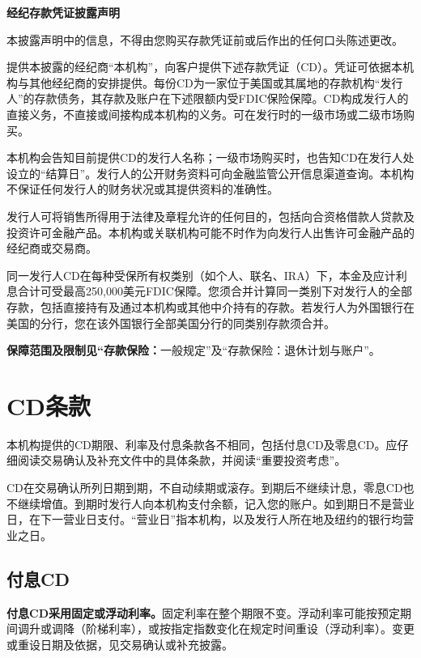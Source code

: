 \documentclass[UTF8,fontset=none,11pt,a4paper]{ctexart}
\begin{document}
{\noindent\fontsize{20}{25}\selectfont\bfseries 经纪存款凭证披露声明\par}
\vspace{10pt}
本披露声明中的信息，不得由您购买存款凭证前或后作出的任何口头陈述更改。


提供本披露的经纪商“本机构”，向客户提供下述存款凭证（CD）。凭证可依据本机构与其他经纪商的安排提供。每份CD为一家位于美国或其属地的存款机构“发行人”的存款债务，其存款及账户在下述限额内受FDIC保险保障。CD构成发行人的直接义务，不直接或间接构成本机构的义务。可在发行时的一级市场或二级市场购买。


本机构会告知目前提供CD的发行人名称；一级市场购买时，也告知CD在发行人处设立的“结算日”。发行人的公开财务资料可向金融监管公开信息渠道查询。本机构不保证任何发行人的财务状况或其提供资料的准确性。


发行人可将销售所得用于法律及章程允许的任何目的，包括向合资格借款人贷款及投资许可金融产品。本机构或关联机构可能不时作为向发行人出售许可金融产品的经纪商或交易商。


同一发行人CD在每种受保所有权类别（如个人、联名、IRA）下，本金及应计利息合计可受最高250,000美元FDIC保障。您须合并计算同一类别下对发行人的全部存款，包括直接持有及通过本机构或其他中介持有的存款。若发行人为外国银行在美国的分行，您在该外国银行全部美国分行的同类别存款须合并。


\textbf{保障范围及限制见“存款保险：}一般规定”及“存款保险：退休计划与账户”。


\section*{CD条款}
本机构提供的CD期限、利率及付息条款各不相同，包括付息CD及零息CD。应仔细阅读交易确认及补充文件中的具体条款，并阅读“重要投资考虑”。


CD在交易确认所列日期到期，不自动续期或滚存。到期后不继续计息，零息CD也不继续增值。到期时发行人向本机构支付余额，记入您的账户。如到期日不是营业日，在下一营业日支付。“营业日”指本机构，以及发行人所在地及纽约的银行均营业之日。


\subsection*{付息CD}
\textbf{付息CD采用固定或浮动利率。}固定利率在整个期限不变。浮动利率可能按预定期间调升或调降（阶梯利率），或按指定指数变化在规定时间重设（浮动利率）。变更或重设日期及依据，见交易确认或补充披露。
\end{document}
